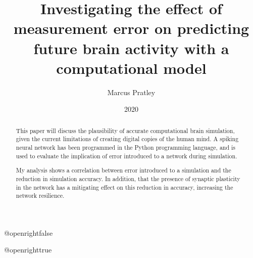 \documentclass[10.5pt,twoside,openright]{report}
\title{Investigating the effect of measurement error on predicting future brain
activity with a computational model}
\author{Marcus Pratley}
\date{2020}
\begin{document}
\csname @openrightfalse\endcsname

\maketitle

\declaration

\dedication{With thanks to Frances Hutchins and Professor Marcus Kaiser, who have both been a great help throughout the unusually fraught environment of creating this dissertation. \\ \vspace{1ex} Extra thanks also to my family, and parents in particular, for all their love and support over the course of my degree. }

\begin{abstract}
This paper will discuss the plausibility of accurate computational brain
simulation, given the current limitations of creating digital copies of the
human mind. A spiking neural network has been programmed in the Python programming language, and is used to evaluate the implication of error introduced to a network during simulation. 

My analysis shows a correlation between error introduced to a simulation and the reduction in simulation accuracy. In addition, that the presence of synaptic plasticity in the network has a mitigating effect on this reduction in accuracy, increasing the network resilience.

\end{abstract}

\def\table{\def\figurename{Table}\figure}
\let\endtable\endfigure
\renewcommand\listfigurename{List of Figures and Tables}

\tableofcontents
\listoffigures
\csname @openrighttrue\endcsname




% 



\printbibliography[heading=bibintoc]
\end{document}
